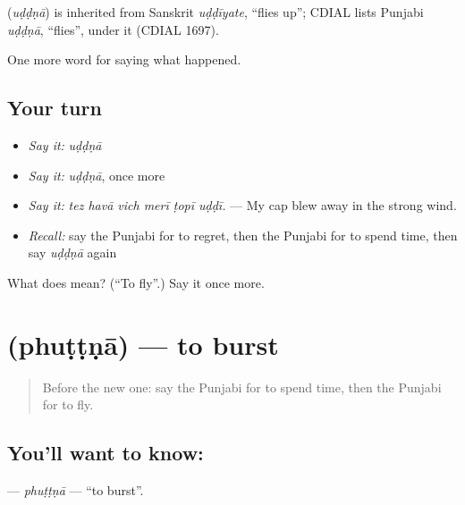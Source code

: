 \begin{cousinweb}
\textbf{} (\emph{uḍḍṇā}) is inherited from Sanskrit \emph{uḍḍīyate}, \textquotedblleft{}flies up\textquotedblright{}; CDIAL lists Punjabi \emph{uḍḍṇā}, \textquotedblleft{}flies\textquotedblright{}, under it (CDIAL 1697).
\end{cousinweb}

\begin{grammarlens}[title={What you've built}]
One more word for saying what happened.
\end{grammarlens}

\subsection*{Your turn}
\begin{itemize}
\raggedright
  \item \emph{Say it:} \emph{uḍḍṇā}
  \item \emph{Say it:} \emph{uḍḍṇā}, once more
  \item \emph{Say it:} \emph{tez havā vich merī ṭopī uḍḍī.} — My cap blew away in the strong wind.
  \item \emph{Recall:} say the Punjabi for to regret, then the Punjabi for to spend time, then say \emph{uḍḍṇā} again
\end{itemize}

\begin{tcolorbox}[breakable,colback=teal!4,colframe=teal!35!black,title={Before you move on}]
What does  mean? (\textquotedblleft{}To fly\textquotedblright{}.) Say it once more.
\end{tcolorbox}
\section[\texorpdfstring{\pa{ਫੁੱਟਣਾ} (phuṭṭṇā)}{ਫੁੱਟਣਾ (phuṭṭṇā)}]{ (phuṭṭṇā) — to burst}

\label{lesson:PA-C318-phuttna}



\begin{quote}
Before the new one: say the Punjabi for to spend time, then the Punjabi for to fly.
\end{quote}

\subsection*{You'll want to know: }
\textbf{} — \emph{phuṭṭṇā} — \textquotedblleft{}to burst\textquotedblright{}.

